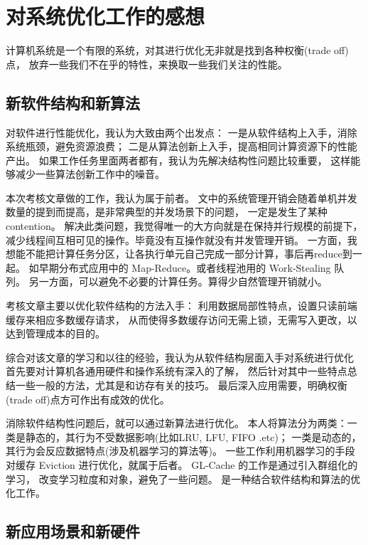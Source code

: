 \section{对系统优化工作的感想}

计算机系统是一个有限的系统，对其进行优化无非就是找到各种权衡(trade off)点，
放弃一些我们不在乎的特性，来换取一些我们关注的性能。

\subsection{新软件结构和新算法}

对软件进行性能优化，我认为大致由两个出发点：
一是从软件结构上入手，消除系统瓶颈，避免资源浪费；
二是从算法创新上入手，提高相同计算资源下的性能产出。
如果工作任务里面两者都有，我认为先解决结构性问题比较重要，
这样能够减少一些算法创新工作中的噪音。

本次考核文章\cite{qiu_frozenhot_2023}做的工作，我认为属于前者。
文中的系统管理开销会随着单机并发数量的提到而提高，是非常典型的并发场景下的问题，
一定是发生了某种 contention。
解决此类问题，我觉得唯一的大方向就是在保持并行规模的前提下，
减少线程间互相可见的操作。毕竟没有互操作就没有并发管理开销。
一方面，我想能不能把计算任务分区，让各执行单元自己完成一部分计算，事后再reduce到一起。
如早期分布式应用中的 Map-Reduce。或者线程池用的 Work-Stealing 队列。
另一方面，可以避免不必要的计算任务。算得少自然管理开销就小。

考核文章主要以优化软件结构的方法入手：
利用数据局部性特点，设置只读前端缓存来相应多数缓存请求，
从而使得多数缓存访问无需上锁，无需写入更改，以达到管理成本的目的。

综合对该文章的学习和以往的经验，我认为从软件结构层面入手对系统进行优化
首先要对计算机各通用硬件和操作系统有深入的了解，
然后针对其中一些特点总结一些一般的方法，尤其是和访存有关的技巧。
最后深入应用需要，明确权衡(trade off)点方可作出有成效的优化。

消除软件结构性问题后，就可以通过新算法进行优化。
本人将算法分为两类：一类是静态的，其行为不受数据影响(比如LRU, LFU, FIFO .etc)；
一类是动态的，其行为会反应数据特点(涉及机器学习的算法等)。
一些工作利用机器学习的手段对缓存 Eviction 进行优化，就属于后者。
GL-Cache 的工作是通过引入群组化的学习，
改变学习粒度和对象，避免了一些问题\cite{yang_gl-cache_nodate}。
是一种结合软件结构和算法的优化工作。

\subsection{新应用场景和新硬件}

